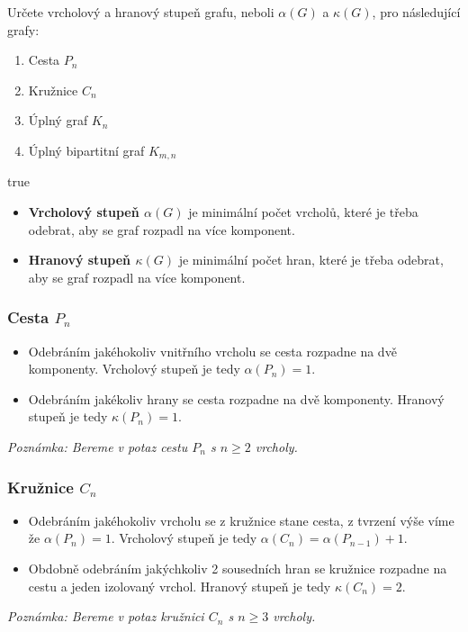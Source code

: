 \documentclass[10pt, a4paper]{ReportSheet}
\begin{document}
    \begin{uloha}{8}{2}{
        Určete vrcholový a hranový stupeň grafu, neboli $\alpha(G)$ a $\kappa(G)$, pro následující grafy:
        \begin{enumerate}
            \renewcommand{\theenumi}{\alph{enumi}}
            \item Cesta $P_n$
            \item Kružnice $C_n$
            \item Úplný graf $K_n$
            \item Úplný bipartitní graf $K_{m,n}$
        \end{enumerate}
    }{true}

        \begin{itemize}
            \item \textbf{Vrcholový stupeň $\alpha(G)$} je minimální počet vrcholů, které je třeba odebrat, aby se graf
            rozpadl na více komponent.
            \item \textbf{Hranový stupeň $\kappa(G)$} je minimální počet hran, které je třeba odebrat, aby se graf rozpadl
            na více komponent.
        \end{itemize}

        \subsubsection{Cesta $P_n$}
        \label{subsubsec:ukol-2-8-cesta}
        \begin{itemize}
            \item Odebráním jakéhokoliv vnitřního vrcholu se cesta rozpadne na dvě komponenty. Vrcholový stupeň je tedy $\alpha(P_n) = 1$.
            \item Odebráním jakékoliv hrany se cesta rozpadne na dvě komponenty. Hranový stupeň je tedy $\kappa(P_n) = 1$.
        \end{itemize}
        \textit{Poznámka: Bereme v potaz cestu $P_n$ s $n \geq 2$ vrcholy.}

        \subsubsection{Kružnice $C_n$}
        \begin{itemize}
            \item Odebráním jakéhokoliv vrcholu se z kružnice stane cesta, z tvrzení výše víme že $\alpha(P_n) = 1$.
            Vrcholový stupeň je tedy $\alpha(C_n) = \alpha(P_{n-1}) + 1$.
            \item Obdobně odebráním jakýchkoliv 2 sousedních hran se kružnice rozpadne na cestu a jeden izolovaný vrchol. Hranový stupeň je tedy $\kappa(C_n) = 2$.
        \end{itemize}
        \textit{Poznámka: Bereme v potaz kružnici $C_n$ s $n \geq 3$ vrcholy.}


\end{uloha}
\end{document}
